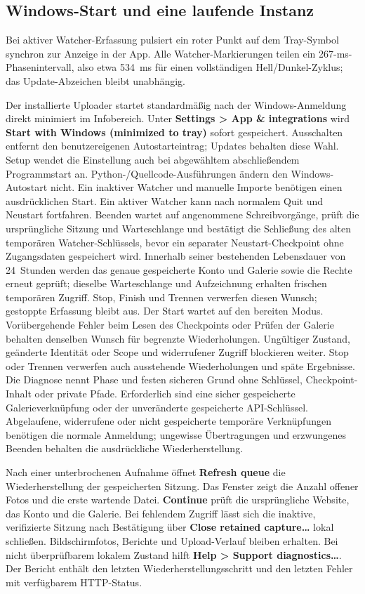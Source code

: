 \documentclass[11pt,a4paper]{article}
\newcommand{\ui}[1]{\textbf{#1}}
\begin{document}
\subsection{Windows-Start und eine laufende Instanz}

Bei aktiver Watcher-Erfassung pulsiert ein roter Punkt auf dem Tray-Symbol
synchron zur Anzeige in der App. Alle Watcher-Markierungen teilen ein
267-ms-Phasenintervall, also etwa 534~ms für einen vollständigen
Hell/Dunkel-Zyklus; das Update-Abzeichen bleibt unabhängig.

Der installierte Uploader startet standardmäßig nach der Windows-Anmeldung
direkt minimiert im Infobereich. Unter \ui{Settings > App \& integrations}
wird \ui{Start with Windows (minimized to tray)} sofort gespeichert. Ausschalten
entfernt den benutzereigenen Autostarteintrag; Updates behalten diese Wahl.
Setup wendet die Einstellung auch bei abgewähltem abschließendem Programmstart
an. Python-/Quellcode-Ausführungen ändern den Windows-Autostart nicht.
Ein inaktiver Watcher und manuelle Importe benötigen einen ausdrücklichen Start.
Ein aktiver Watcher kann nach normalem Quit und Neustart fortfahren. Beenden
wartet auf angenommene Schreibvorgänge, prüft die ursprüngliche Sitzung und
Warteschlange und bestätigt die Schließung des alten temporären Watcher-Schlüssels,
bevor ein separater Neustart-Checkpoint ohne Zugangsdaten gespeichert wird.
Innerhalb seiner bestehenden Lebensdauer von 24~Stunden werden das genaue
gespeicherte Konto und Galerie sowie die Rechte erneut geprüft; dieselbe
Warteschlange und Aufzeichnung erhalten frischen temporären Zugriff.
Stop, Finish und Trennen verwerfen diesen Wunsch; gestoppte Erfassung bleibt aus.
Der Start wartet auf den bereiten Modus. Vorübergehende Fehler beim Lesen des
Checkpoints oder Prüfen der Galerie behalten denselben Wunsch für begrenzte
Wiederholungen. Ungültiger Zustand, geänderte Identität oder Scope und
widerrufener Zugriff blockieren weiter. Stop oder Trennen verwerfen auch
ausstehende Wiederholungen und späte Ergebnisse. Die Diagnose nennt Phase und
festen sicheren Grund ohne Schlüssel, Checkpoint-Inhalt oder private Pfade.
Erforderlich sind eine sicher gespeicherte Galerieverknüpfung oder der unveränderte
gespeicherte API-Schlüssel. Abgelaufene, widerrufene oder nicht gespeicherte
temporäre Verknüpfungen benötigen die normale Anmeldung; ungewisse Übertragungen
und erzwungenes Beenden behalten die ausdrückliche Wiederherstellung.

Nach einer unterbrochenen Aufnahme öffnet \ui{Refresh queue} die
Wiederherstellung der gespeicherten Sitzung. Das Fenster zeigt die Anzahl
offener Fotos und die erste wartende Datei. \ui{Continue} prüft die
ursprüngliche Website, das Konto und die Galerie. Bei fehlendem Zugriff
lässt sich die inaktive, verifizierte Sitzung nach Bestätigung über
\ui{Close retained capture…} lokal schließen. Bildschirmfotos, Berichte
und Upload-Verlauf bleiben erhalten. Bei nicht überprüfbarem lokalem Zustand
hilft \ui{Help > Support diagnostics…}. Der Bericht enthält den letzten
Wiederherstellungsschritt und den letzten Fehler mit verfügbarem HTTP-Status.
\end{document}
